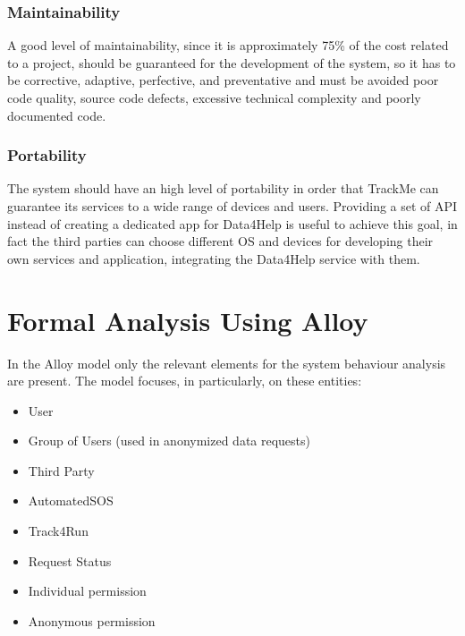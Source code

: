 \documentclass[a4paper]{article}
\begin{document}
\vspace{0.5cm}

\subsubsection{Maintainability}

A good level of maintainability, since it is approximately 75\% of the cost related to a project, should be guaranteed for the development of the system, so it has to be corrective, adaptive, perfective, and preventative and
must be avoided poor code quality, source code defects, excessive technical complexity and poorly documented code.

\vspace{0.5cm}

\subsubsection{Portability}

The system should have an high level of portability in order that TrackMe can guarantee its services to a wide range of devices and users.
Providing a set of API instead of creating a dedicated app for Data4Help is useful to achieve this goal, in fact the third parties can choose different OS and devices for developing their own services and application, integrating the Data4Help service with them.
\clearpage

\section{Formal Analysis Using Alloy}

In the Alloy model only the relevant elements for the system behaviour analysis are present. The model focuses, in particularly, on these entities:

\begin{itemize}
    \item User
    \item Group of Users (used in anonymized data requests)
    \item Third Party
    \item AutomatedSOS
    \item Track4Run
    \item Request Status
    \item Individual permission
    \item Anonymous permission      
\end{itemize}
\end{document}
